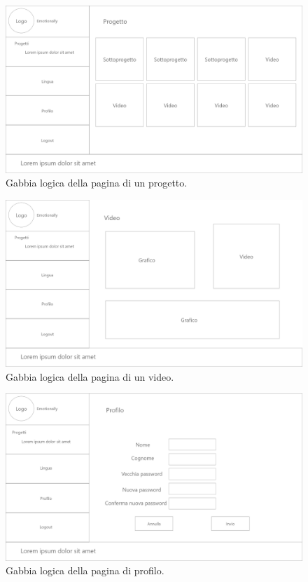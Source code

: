 \begin{figure}[H]
	\centering
	\caption{Gabbia logica della pagina di un progetto.}
	\label{fig:gabbie-logiche:project}
	\includegraphics[width=\textwidth]{images/gabbie-logiche/Progetto}
\end{figure}

\begin{figure}[H]
	\centering
	\caption{Gabbia logica della pagina di un video.}
	\label{fig:gabbie-logiche:video}
	\includegraphics[width=\textwidth]{images/gabbie-logiche/Video}
\end{figure}

\begin{figure}[H]
	\centering
	\caption{Gabbia logica della pagina di profilo.}
	\label{fig:gabbie-logiche:profilo}
	\includegraphics[width=\textwidth]{images/gabbie-logiche/Profilo}
\end{figure}

